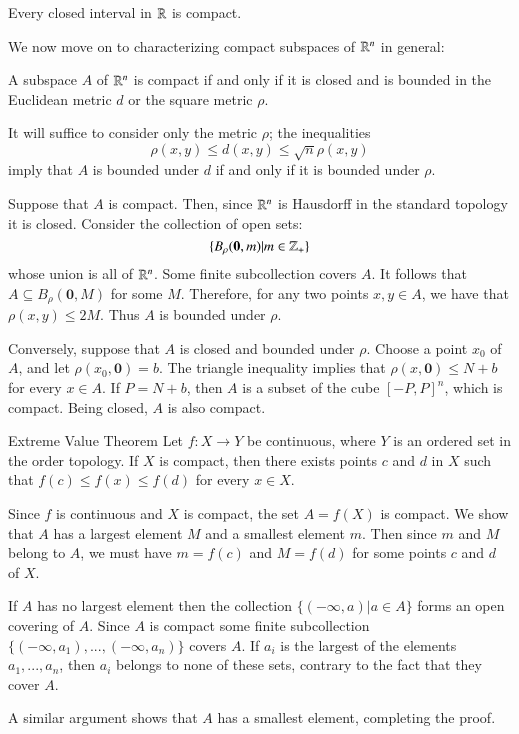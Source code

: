 \documentclass[12pt, a4paper, twoside, openright, titlepage]{book}
\begin{document}
\begin{cor}{}{}
    Every closed interval in $\mathbb R$ is compact.
\end{cor}

We now move on to characterizing compact subspaces of $\mathbb R^n$ in general:

\begin{thm}{}{}
    A subspace $A$ of $\mathbb R^n$ is compact if and only if it is closed and is bounded in the Euclidean metric $d$ or the square metric $\rho$.
\end{thm}
\begin{proof*}{}{}
    It will suffice to consider only the metric $\rho$; the inequalities \begin{equation*}
        \rho(x,y) \leq d(x,y) \leq \sqrt{n}\rho(x,y)
    \end{equation*}
    imply that $A$ is bounded under $d$ if and only if it is bounded under $\rho$.

    Suppose that $A$ is compact. Then, since $\mathbb R^n$ is Hausdorff in the standard topology it is closed. Consider the collection of open sets: 
    \begin{equation*}
        \{B_{\rho}(\mathbf{0},m)\vert m \in \mathbb Z_+\}
    \end{equation*}
    whose union is all of $\mathbb R^n$. Some finite subcollection covers $A$. It follows that $A \subseteq B_{\rho}(\mathbf{0},M)$ for some $M$. Therefore, for any two points $x,y \in A$, we have that $\rho(x,y) \leq 2M$. Thus $A$ is bounded under $\rho$.

    Conversely, suppose that $A$ is closed and bounded under $\rho$. Choose a point $x_0$ of $A$, and let $\rho(x_0,\mathbf{0}) = b$. The triangle inequality implies that $\rho(x,\mathbf{0})\leq N + b$ for every $x \in A$. If $P = N + b$, then $A$ is a subset of the cube $[-P,P]^n$, which is compact. Being closed, $A$ is also compact.
\end{proof*}

\begin{namthm}{Extreme Value Theorem}{}
     Let $f:X\rightarrow Y$ be continuous, where $Y$ is an ordered set in the order topology. If $X$ is compact, then there exists points $c$ and $d$ in $X$ such that $f(c) \leq f(x) \leq f(d)$ for every $x \in X$.
\end{namthm}
\begin{proof*}{}{}
    Since $f$ is continuous and $X$ is compact, the set $A = f(X)$ is compact. We show that $A$ has a largest element $M$ and a smallest element $m$. Then since $m$ and $M$ belong to $A$, we must have $m = f(c)$ and $M = f(d)$ for some points $c$ and $d$ of $X$.

    If $A$ has no largest element then the collection $\{(-\infty,a)\vert a \in A\}$ forms an open covering of $A$. Since $A$ is compact some finite subcollection $\{(-\infty,a_1),...,(-\infty,a_n)\}$ covers $A$. If $a_i$ is the largest of the elements $a_1,...,a_n$, then $a_i$ belongs to none of these sets, contrary to the fact that they cover $A$.
    
    A similar argument shows that $A$ has a smallest element, completing the proof.
\end{proof*}
\end{document}
